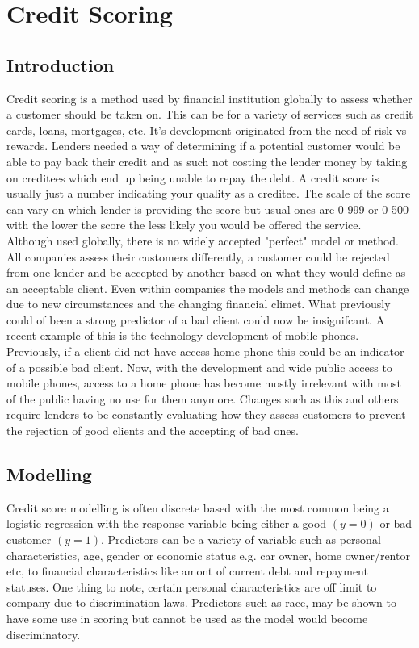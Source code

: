 \chapter{Credit Scoring}

\section{Introduction}
Credit scoring is a method used by financial institution globally to assess whether a customer should be taken on. This can be for a variety of services such as credit cards, loans, mortgages, etc. It's development originated from the need of risk vs rewards. Lenders needed a way of determining if a potential customer would be able to pay back their credit and as such not costing the lender money by taking on creditees which end up being unable to repay the debt. A credit score is usually just a number indicating your quality as a creditee. The scale of the score can vary on which lender is providing the score but usual ones are 0-999 or 0-500 with the lower the score the less likely you would be offered the service. \\

Although used globally, there is no widely accepted "perfect" model or method. All companies assess their customers differently, a customer could be rejected from one lender and be accepted by another based on what they would define as an acceptable client. Even within companies the models and methods can change due to new circumstances and the changing financial climet. What previously could of been a strong predictor of a bad client could now be insignifcant. A recent example of this is the technology development of mobile phones. Previously, if a client did not have access home phone this could be an indicator of a possible bad client. Now, with the development and wide public access to mobile phones, access to a home phone has become mostly irrelevant with most of the public having no use for them anymore. Changes such as this and others require lenders to be constantly evaluating how they assess customers to prevent the rejection of good clients and the accepting of bad ones.

\section{Modelling}
Credit score modelling is often discrete based with the most common being a logistic regression with the response variable being either a good $(y=0)$ or bad customer $(y=1)$. Predictors can be a variety of variable such as personal characteristics, age, gender or economic status e.g. car owner, home owner/rentor etc, to financial characteristics like amont of current debt and repayment statuses. One thing to note, certain personal characteristics are off limit to company due to discrimination laws. Predictors such as race, may be shown to have some use in scoring but cannot be used as the model would become discriminatory.

